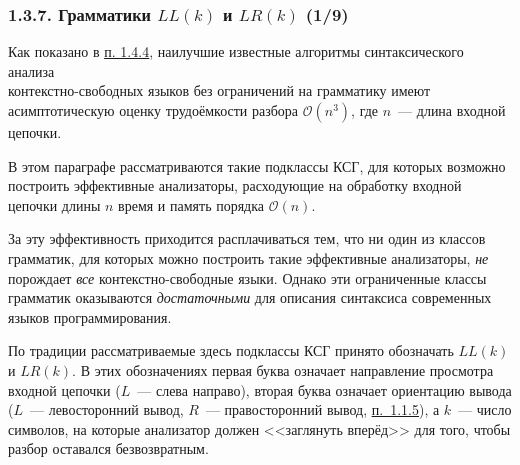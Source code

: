 \documentclass[mathserif,12pt,aspectratio=169]{beamer}
\def\emразделенной{\em разделенной}
\def\em#1{\it\color{blue}#1}
\let\cal\mathcal
\def\DMref#1#2{{\color{blue}\underline{\hyperlink{#2}{#1}}}}
\begin{document}
\begin{frame}
\frametitle{1.3.7. Грамматики $LL(k)$ и $LR(k)$ (1/9)}

Как показано в \DMref{п. 1.4.4}{1.4.4.}, 
наилучшие известные алгоритмы синтаксического анализа \\
контекстно-свободных языков без ограничений на грамматику  
имеют асимптотическую оценку трудоёмкости 
разбора $ \cal{O}(n^3)$, где $n$~--- длина входной цепочки.  

\smallskip
В этом параграфе рассматриваются такие подклассы КСГ, 
для которых возможно построить эффективные анализаторы, 
расходующие на обработку входной цепочки длины \(n\) время и память 
порядка $\cal{O}(n)$. 

\smallskip
За эту эффективность приходится расплачиваться тем, что ни один из классов грамматик,
для которых можно построить такие эффективные анализаторы,
{\em не} порождает {\em все} контекстно-свободные языки. 
Однако эти ограниченные классы грамматик оказываются 
{\em достаточными} для описания синтаксиса современных языков программирования.

\smallskip
\begin{digress}
По традиции рассматриваемые здесь подклассы КСГ
принято обозначать $LL(k)$ и $LR(k)$. 
В этих обозначениях первая буква означает направление просмотра
входной цепочки ($L$~--- слева направо), 
вторая буква означает ориентацию вывода
($L$~--- левосторонний вывод, $R$~--- правосторонний вывод, 
\DMref{п.~1.1.5}{1.1.5.}),
а $k$~--- число символов, на которые анализатор должен <<заглянуть вперёд>>
для того, чтобы разбор оставался безвозвратным. 
\end{digress}

\end{frame}
\end{document}
